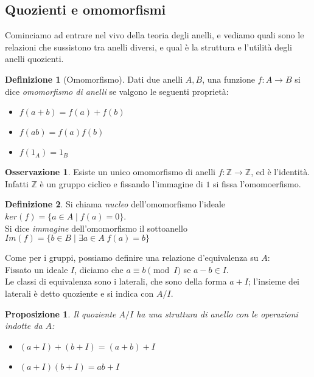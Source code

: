 \documentclass[a4paper,10pt]{article}
\theoremstyle{plain}
\newtheorem{prop}[thm]{Proposizione}
\theoremstyle{definition}
\newtheorem{defn}{Definizione}[section]
\newtheorem*{oss}{Osservazione}
\newcommand{\Z}{\mathbb{Z}}
\begin{document}
\subsection{Quozienti e omomorfismi}
Cominciamo ad entrare nel vivo della teoria degli anelli, e vediamo quali sono le relazioni che sussistono tra anelli diversi, e qual è la struttura e l'utilità degli anelli quozienti.

\begin{defn}[Omomorfismo]
    Dati due anelli $A,B$, una funzione $f:A\to B$ si dice \textit{omomorfismo di anelli} se valgono le seguenti proprietà:
    \begin{itemize}
        \item $f(a+b)=f(a)+f(b)$
        \item $f(ab)=f(a)f(b)$
        \item $f(1_A)=1_B$
    \end{itemize}
\end{defn}
\begin{oss}
    Esiste un unico omomorfismo di anelli $f:\Z\to\Z$, ed è l'identità. Infatti $\Z$ è un gruppo ciclico e fissando l'immagine di $1$ si fissa l'omomoerfismo.
\end{oss}

\begin{defn}
    Si chiama \textit{nucleo} dell'omomorfismo l'ideale $ker(f)=\{a\in A\mid f(a)=0\}$.\\
    Si dice \textit{immagine} dell'omomorfismo il sottoanello $Im(f)=\{b\in B\mid \exists a\in A\; f(a)=b \}$
\end{defn}

Come per i gruppi, possiamo definire una relazione d'equivalenza su $A$:\\
Fissato un ideale $I$, diciamo che $a\equiv b\pmod I$ se $a-b\in I$.\\
Le classi di equivalenza sono i laterali, che sono della forma $a+I$; l'insieme dei laterali è detto quoziente e si indica con $A/I$.
\begin{prop}
    Il quoziente $A/I$ ha una struttura di anello con le operazioni indotte da $A$:
    \begin{itemize}
        \item $(a+I)+(b+I)=(a+b)+I$
        \item $(a+I)(b+I)=ab+I$
    \end{itemize}
\end{prop}
\end{document}
